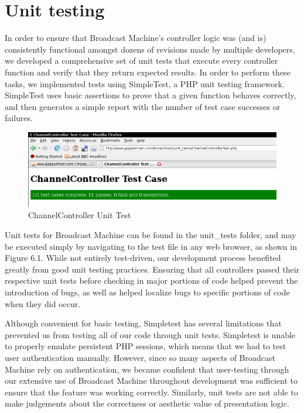 \documentclass[a4paper,12pt]{report}
\begin{document}
\section{Unit testing}
In order to ensure that Broadcast Machine's controller logic was (and is) consistently functional amongst dozens of revisions made by multiple developers, we developed a comprehensive set of unit tests that execute every controller function and verify that they return expected results. In order to perform these tasks, we implemented tests using SimpleTest, a PHP unit testing framework. SimpleTest uses basic assertions to prove that a given function behaves correctly, and then generates a simple report with the number of test case successes or failures.

\begin{figure}[htp]
\begin{center}
\includegraphics[scale=0.45]{./images/unittest.png}
\end{center}
\caption{ChannelController Unit Test}
\end{figure}

Unit tests for Broadcast Machine can be found in the unit\_tests folder, and may be executed simply by navigating to the test file in any web browser, as shown in Figure 6.1. While not entirely test-driven, our development process benefited greatly from good unit testing practices. Ensuring that all controllers passed their respective unit tests before checking in major portions of code helped prevent the introduction of bugs, as well as helped localize bugs to specific portions of code when they did occur. 

Although convenient for basic testing, Simpletest has several limitations that prevented us from testing all of our code through unit tests. Simpletest is unable to properly emulate persistent PHP sessions, which means that we had to test user authentication manually. However, since so many aspects of Broadcast Machine rely on authentication, we became confident that user-testing through our extensive use of Broadcast Machine throughout development was sufficient to ensure that the feature was working correctly. Similarly, unit tests are not able to make judgements about the correctness or aesthetic value of presentation logic. 
\end{document}
